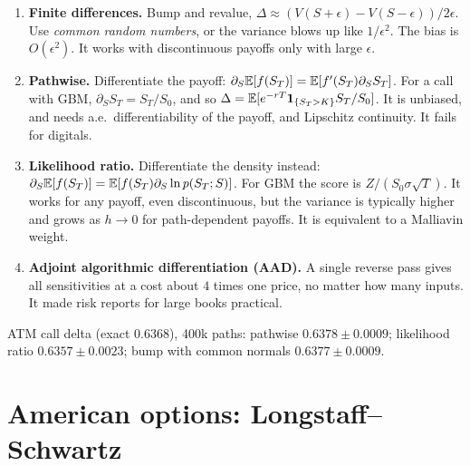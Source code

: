 \begin{enumerate}
\item \textbf{Finite differences.} Bump and revalue, $\Delta\approx(V(S+\epsilon)-V(S-\epsilon))/2\epsilon$. Use \emph{common random numbers}, or the variance blows up like $1/\epsilon^2$. The bias is $O(\epsilon^2)$. It works with discontinuous payoffs only with large $\epsilon$.
\item \textbf{Pathwise.} Differentiate the payoff: $\partial_S\mathbb{E}[f(S_T)]=\mathbb{E}[f'(S_T)\partial_SS_T]$. For a call with GBM, $\partial_SS_T=S_T/S_0$, and so $\Delta=\mathbb{E}[e^{-rT}\mathbf{1}_{\{S_T>K\}}S_T/S_0]$. It is unbiased, and needs a.e.\ differentiability of the payoff, and Lipschitz continuity. It fails for digitals.
\item \textbf{Likelihood ratio.} Differentiate the density instead: $\partial_S\mathbb{E}[f(S_T)]=\mathbb{E}[f(S_T)\partial_S\ln p(S_T;S)]$. For GBM the score is $Z/(S_0\sigma\sqrt T)$. It works for any payoff, even discontinuous, but the variance is typically higher and grows as $h\to 0$ for path-dependent payoffs. It is equivalent to a Malliavin weight.
\item \textbf{Adjoint algorithmic differentiation (AAD).} A single reverse pass gives all sensitivities at a cost about $4$ times one price, no matter how many inputs. It made risk reports for large books practical.
\end{enumerate}

\begin{numcheck}
ATM call delta (exact $0.6368$), 400k paths: pathwise $0.6378\pm0.0009$; likelihood ratio $0.6357\pm0.0023$; bump with common normals $0.6377\pm0.0009$.
\end{numcheck}

\section{American options: Longstaff--Schwartz}

